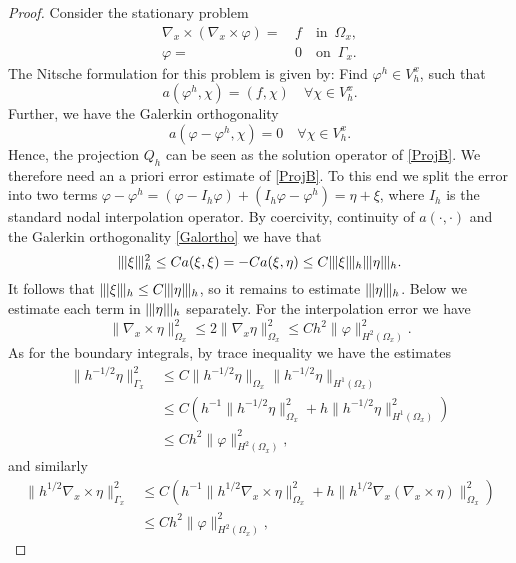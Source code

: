 \documentclass[reqno,a4paper]{amsart}
\theoremstyle{remark}
\numberwithin{equation}{section}
\newcommand{\norm}[1]{\|#1\|}
\newcommand{\Tnorm}[1]{|\mkern-1mu|\mkern-1mu|#1|\mkern-1mu|\mkern-1mu|}
\def\curl{\nabla_x \times }
\def\gradx{\nabla_x}
\def\fii{\varphi}
\begin{document}
\begin{proof}
Consider the stationary problem
\[
\begin{aligned}
\curl ( \curl \fii ) =& \, f \quad \mbox{in} \,\,\, \Omega_x, \\
\fii =& \, 0 \quad \mbox{on} \,\,\, \Gamma_x.
\end{aligned}
\]
The Nitsche formulation for this problem is given by:
Find $ \fii^h \in V^x_h $, such that
\begin{equation} \label{ProjB}
a(\fii^h, \chi) = (f, \chi) \quad \forall \chi \in V^x_h.
\end{equation}
Further, we have the Galerkin orthogonality
\begin{equation}\label{Galortho}
a(\fii - \fii^h, \chi) = 0 \quad \forall \chi \in V^x_h.
\end{equation}
Hence, the projection $ Q_h $ can be seen as the solution operator of 
\eqref{ProjB}.
We therefore need an a priori error estimate of \eqref{ProjB}.
To this end we split the error into two terms $ \fii - \fii^h = 
(\fii - I_h \fii) + (I_h \fii - \fii^h) = \eta + \xi $,
where $ I_h $ is the standard nodal interpolation operator.
By coercivity, continuity of $ a(\cdot, \cdot) $ and the Galerkin orthogonality 
\eqref{Galortho} we have that 
\[
\Tnorm{\xi}_h^2 \leq C a(\xi, \xi) = 
- C a(\xi, \eta) \leq C \Tnorm{\xi}_h \Tnorm{\eta}_h.
\]
It follows that $ \Tnorm{\xi}_h \leq C \Tnorm{\eta}_h $, 
so it remains to estimate $ \Tnorm{\eta}_h $.
Below we estimate each term in $ \Tnorm{\eta}_h $ separately. 
For the interpolation error we have 
\[
\norm{\curl \eta}^2_{\Omega_x} \leq 2 
\norm{\gradx \eta}^2_{\Omega_x} \leq C h^2 \norm{\fii}^2_{H^2(\Omega_x)}.
\]
As for the boundary integrals, by trace inequality we have the estimates
\[
\begin{aligned}
\norm{h^{-1/2} \eta}^2_{\Gamma_x} &\leq 
C \norm{h^{-1/2} \eta}_{\Omega_x} \norm{h^{-1/2} \eta}_{H^1(\Omega_x)} \\
&\leq C \left( h^{-1} \norm{h^{-1/2} \eta}^2_{\Omega_x} 
+ h \norm{h^{-1/2} \eta}^2_{H^1(\Omega_x)} \right) \\
&\leq C h^2 \norm{\fii}^2_{H^2(\Omega_x)}, 
\end{aligned}
\]
and similarly 
\[
\begin{aligned}
\norm{h^{1/2} \curl \eta}^2_{\Gamma_x} &\leq 
C \left( h^{-1} \norm{h^{1/2} \curl \eta}^2_{\Omega_x}
+ h \norm{h^{1/2} \gradx (\curl \eta)}^2_{\Omega_x} \right) \\
&\leq C h^2 \norm{\fii}^2_{H^2(\Omega_x)}, 
\end{aligned}
\]
\end{proof}
\end{document}
